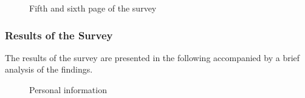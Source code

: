 \documentclass[11pt]{report}
\begin{document}
\begin{figure}[h!]
    \centering
    \hfill
    \caption{Fifth and sixth page of the survey}
\end{figure}

\subsubsection{Results of the Survey}

The results of the survey are presented in the following accompanied by a brief analysis of the findings.
\begin{figure}
    \centering
\end{figure}

\begin{figure}\ContinuedFloat
    \centering
    \caption{Personal information}
\end{figure}
\end{document}

